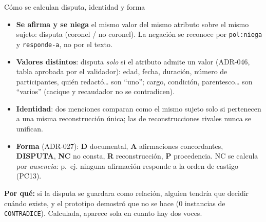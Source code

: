 \documentclass[aspectratio=169,10pt]{beamer}
\newcommand{\ttt}[1]{\texttt{\small #1}}
\newcommand{\porque}[1]{\par\smallskip\colorbox{ocre!10}{\parbox{\dimexpr\linewidth-2\fboxsep}{\footnotesize\textbf{Por qué:} #1}}}
\begin{document}
\begin{frame}{Cómo se calculan disputa, identidad y forma}
\small
\begin{itemize}
\item \textbf{Se afirma y se niega} el mismo valor del mismo atributo sobre el mismo sujeto: disputa (coronel / no
      coronel). La negación se reconoce por \ttt{pol:niega} y \ttt{responde-a}, no por el texto.
\item \textbf{Valores distintos}: disputa \emph{solo} si el atributo admite un valor (ADR-046, tabla aprobada por el
      validador): edad, fecha, duración, número de participantes, quién redactó… son \enquote{uno}; cargo, condición,
      parentesco… son \enquote{varios} (cacique y recaudador no se contradicen).
\item \textbf{Identidad}: dos menciones comparan como el mismo sujeto solo si pertenecen a una \alert{misma
      reconstrucción única}; las de reconstrucciones rivales nunca se unifican.
\item \textbf{Forma} (ADR-027): \textbf{D} documental, \textbf{A} afirmaciones concordantes, \textbf{DISPUTA},
      \textbf{NC} no consta, \textbf{R} reconstrucción, \textbf{P} procedencia. NC se calcula por \emph{ausencia}: p.~ej.
      ninguna afirmación responde a la orden de castigo (PC13).
\end{itemize}
\porque{si la disputa se guardara como relación, alguien tendría que decidir cuándo existe, y el prototipo demostró que
no se hace (0 instancias de \ttt{CONTRADICE}). Calculada, aparece sola en cuanto hay dos voces.}
\end{frame}
\end{document}
